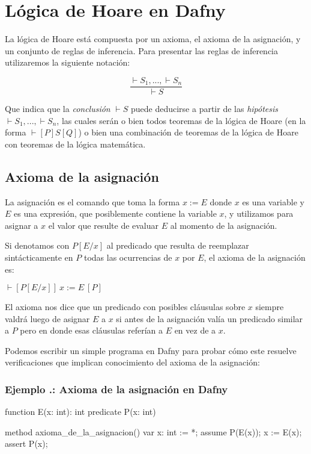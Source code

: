 \documentclass[12pt, a4paper, openany, fleqn]{book}
\newcounter{example}[chapter]
\renewcommand{\theexample}{\thechapter.\arabic{example}}
\newcommand{\example}[1]{
  \refstepcounter{example} %
  \subsubsection*{Ejemplo \theexample: #1}
}
\newcommand{\hoareTheorem}[3]{\ensuremath{\vdash[#1]\ #2\ [#3]}}
\newcommand{\inferenceRule}[2]{
    \begin{equation*}
        \frac{#1}{#2}
    \end{equation*}
}
\begin{document}
    \section{Lógica de Hoare en Dafny}
    La lógica de Hoare está compuesta por un axioma, el axioma de la asignación, y un conjunto de reglas de inferencia. Para presentar las reglas de inferencia utilizaremos la siguiente notación:
    \inferenceRule{\vdash S_1, ..., \vdash S_n}{\vdash S}
    Que indica que la \textit{conclusión} $\vdash S$ puede deducirse a partir de las \textit{hipótesis} $\vdash S_1, ..., \vdash S_n$, las cuales serán o bien todos teoremas de la lógica de Hoare (en la forma $\vdash[P]S[Q]$) o bien una combinación de teoremas de la lógica de Hoare con teoremas de la lógica matemática.

    \subsection{Axioma de la asignación}
    La asignación es el comando que toma la forma $x := E$ donde $x$ es una variable y $E$ es una expresión, que posiblemente contiene la variable $x$, y utilizamos para asignar a $x$ el valor que resulte de evaluar $E$ al momento de la asignación.

    Si denotamos con $P[E/x]$ al predicado que resulta de reemplazar sintácticamente en $P$ todas las ocurrencias de $x$ por $E$, el axioma de la asignación es:

    \begin{center}
        \hoareTheorem{P[E/x]}{x:=E}{P}
    \end{center}

    El axioma nos dice que un predicado con posibles cláusulas sobre $x$ siempre valdrá  luego de asignar $E$ a $x$ si antes de la asignación valía un predicado similar a $P$ pero en donde esas cláusulas referían a $E$ en vez de a $x$.

    Podemos escribir un simple programa en Dafny para probar cómo este resuelve verificaciones que implican conocimiento del axioma de la asignación:

    \example{Axioma de la asignación en Dafny}
    \begin{greenbox}
    \begin{dafny}[gobble=8]
        function E(x: int): int
        predicate P(x: int)

        method axioma_de_la_asignacion()
        {
            var x: int := *;
            assume P(E(x));
            x := E(x);
            assert P(x);
        }
    \end{dafny}
    \end{greenbox}
\end{document}
